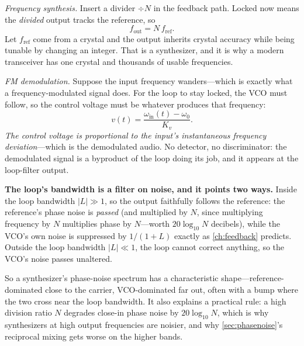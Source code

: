 \emph{Frequency synthesis.} Insert a divider \(\div N\) in the feedback path. Locked
now means the \emph{divided} output tracks the reference, so
\[
f_{\mathrm{out}}=N\,f_{\mathrm{ref}} .
\]
Let \(f_{\mathrm{ref}}\) come from a crystal and the output inherits crystal accuracy
while being tunable by changing an integer. That is a synthesizer, and it is why a
modern transceiver has one crystal and thousands of usable frequencies.

\emph{FM demodulation.} Suppose the input frequency wanders---which is exactly what a
frequency-modulated signal does. For the loop to stay locked, the VCO must follow, so
the control voltage must be whatever produces that frequency:
\[
v(t)=\frac{\omega_{\mathrm{in}}(t)-\omega_0}{K_v} .
\]
\emph{The control voltage is proportional to the input's instantaneous frequency
deviation}---which is the demodulated audio. No detector, no discriminator: the
demodulated signal is a byproduct of the loop doing its job, and it appears at the
loop-filter output.

\begin{controlsbox}
\textbf{The loop's bandwidth is a filter on noise, and it points two ways.} Inside the
loop bandwidth \(|L|\gg1\), so the output faithfully follows the reference: the
reference's phase noise is \emph{passed} (and multiplied by \(N\), since multiplying
frequency by \(N\) multiplies phase by \(N\)---worth \(20\log_{10}N\) decibels), while
the VCO's own noise is suppressed by \(1/(1+L)\) exactly as \cref{ch:feedback}
predicts. Outside the loop bandwidth \(|L|\ll1\), the loop cannot correct anything, so
the VCO's noise passes unaltered.

So a synthesizer's phase-noise spectrum has a characteristic shape---reference-dominated
close to the carrier, VCO-dominated far out, often with a bump where the two cross near
the loop bandwidth. It also explains a practical rule: a high division ratio \(N\)
degrades close-in phase noise by \(20\log_{10}N\), which is why synthesizers at high
output frequencies are noisier, and why \cref{sec:phasenoise}'s reciprocal mixing gets
worse on the higher bands.
\end{controlsbox}

